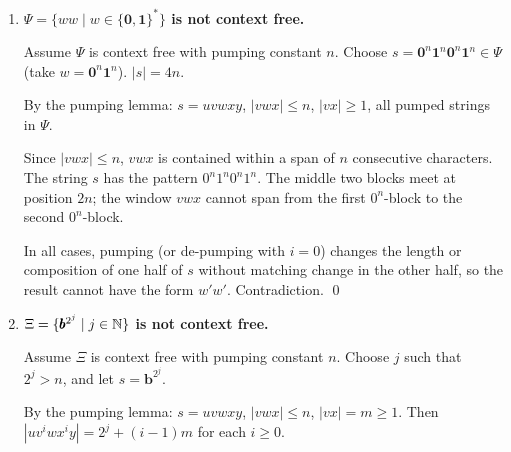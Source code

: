 \begin{enumerate}[{9.}1. ]
Assume $\Gamma$ is context free with pumping constant $n$. Choose $s = \pmb{0}^n\pmb{1}^n\pmb{2}\pmb{0}^n\pmb{1}^n \in \Gamma$ (take $w = \pmb{0}^n\pmb{1}^n$, $|s| = 4n+1$).

By the pumping lemma: $s = uvwxy$, $|vwx| \leq n$, $|vx| \geq 1$, all pumped strings in $\Gamma$.

Since $|vwx| \leq n$, the substring $vwx$ lies entirely within one of the following regions: the first $\pmb{0}^n$-block, the $\pmb{1}^n$-block, the $\pmb{2}$ separator, the second $\pmb{0}^n$-block, or the second $\pmb{1}^n$-block (it cannot span the $\pmb{2}$ and both sides).

In any case, pumping changes the count of some symbol on one side of $\pmb{2}$ without affecting the other side, or changes only one block. The result is a string that cannot be of the form $w'\pmb{2}w'$ for any $w'$. Contradiction. \qed

\item \textbf{$\Psi = \{ww \mid w \in \{\pmb{0},\pmb{1}\}^*\}$ is not context free.}

Assume $\Psi$ is context free with pumping constant $n$. Choose $s = \pmb{0}^n\pmb{1}^n\pmb{0}^n\pmb{1}^n \in \Psi$ (take $w = \pmb{0}^n\pmb{1}^n$). $|s| = 4n$.

By the pumping lemma: $s = uvwxy$, $|vwx| \leq n$, $|vx| \geq 1$, all pumped strings in $\Psi$.

Since $|vwx| \leq n$, $vwx$ is contained within a span of $n$ consecutive characters. The string $s$ has the pattern $0^n1^n0^n1^n$. The middle two blocks meet at position $2n$; the window $vwx$ cannot span from the first $0^n$-block to the second $0^n$-block.

In all cases, pumping (or de-pumping with $i=0$) changes the length or composition of one half of $s$ without matching change in the other half, so the result cannot have the form $w'w'$. Contradiction. \qed

\item \textbf{$\Xi = \{\pmb{b}^{2^j} \mid j \in \mathbb{N}\}$ is not context free.}

Assume $\Xi$ is context free with pumping constant $n$. Choose $j$ such that $2^j > n$, and let $s = \pmb{b}^{2^j}$.

By the pumping lemma: $s = uvwxy$, $|vwx| \leq n$, $|vx| = m \geq 1$. Then $|uv^i wx^i y| = 2^j + (i-1)m$ for each $i \geq 0$.


\end{enumerate}
